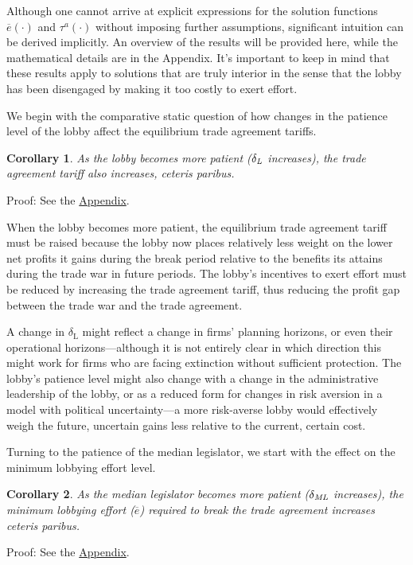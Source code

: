 \documentclass[authoryear, review]{elsarticle}
\newtheorem{corollary}{Corollary}
\newcommand{\ov}{\overline}
\newcommand{\de}{\delta}
\begin{document}
Although one cannot arrive at explicit expressions for the solution functions $\ov{e}(\cdot)$ and $\tau^a(\cdot)$ without imposing further assumptions, significant intuition can be derived implicitly. An overview of the results will be provided here, while the mathematical details are in the Appendix. It's important to keep in mind that these results apply to solutions that are truly interior in the sense that the lobby has been disengaged by making it too costly to exert effort.

We begin with the comparative static question of how changes in the patience level of the lobby affect the equilibrium trade agreement tariffs.

\begin{corollary}
  As the lobby becomes more patient ($\de_\emph{L}$ increases), the trade agreement tariff also increases, \emph{ceteris paribus}.
  \label{cor:tdl}
\end{corollary}

Proof: See the \hyperlink{Cor_tdl}{Appendix}.

\noindent When the lobby becomes more patient, the equilibrium trade agreement tariff must be raised because the lobby now places relatively less weight on the lower net profits it gains during the break period relative to the benefits its attains during the trade war in future periods. The lobby's incentives to exert effort must be reduced by increasing the trade agreement tariff, thus reducing the profit gap between the trade war and the trade agreement.

A change in $\de_\text{L}$ might reflect a change in firms' planning horizons, or even their operational horizons---although it is not entirely clear in which direction this might work for firms who are facing extinction without sufficient protection. The lobby's patience level might also change with a change in the administrative leadership of the lobby, or as a reduced form for changes in risk aversion in a model with political uncertainty---a more risk-averse lobby would effectively weigh the future, uncertain gains less relative to the current, certain cost.

Turning to the patience of the median legislator, we start with the effect on the minimum lobbying effort level.

\begin{corollary}
  As the median legislator becomes more patient ($\de_\emph{ML}$ increases), the minimum lobbying effort ($\ov{e}$) required to break the trade agreement increases \emph{ceteris paribus}.
  \label{cor:edm}
\end{corollary}
Proof: See the \hyperlink{Cor_edm}{Appendix}.
\end{document}
